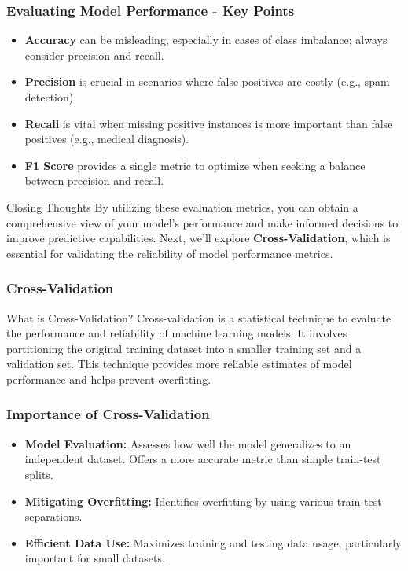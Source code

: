 \documentclass[aspectratio=169]{beamer}
\begin{document}
\begin{frame}[fragile]
    \frametitle{Evaluating Model Performance - Key Points}
    \begin{itemize}
        \item \textbf{Accuracy} can be misleading, especially in cases of class imbalance; always consider precision and recall.
        \item \textbf{Precision} is crucial in scenarios where false positives are costly (e.g., spam detection).
        \item \textbf{Recall} is vital when missing positive instances is more important than false positives (e.g., medical diagnosis).
        \item \textbf{F1 Score} provides a single metric to optimize when seeking a balance between precision and recall.
    \end{itemize}
    
    \begin{block}{Closing Thoughts}
        By utilizing these evaluation metrics, you can obtain a comprehensive view of your model's performance and make informed decisions to improve predictive capabilities. Next, we’ll explore \textbf{Cross-Validation}, which is essential for validating the reliability of model performance metrics.
    \end{block}
\end{frame}

\begin{frame}[fragile]
    \frametitle{Cross-Validation}
    \begin{block}{What is Cross-Validation?}
        Cross-validation is a statistical technique to evaluate the performance and reliability of machine learning models. It involves partitioning the original training dataset into a smaller training set and a validation set. This technique provides more reliable estimates of model performance and helps prevent overfitting.
    \end{block}
\end{frame}

\begin{frame}[fragile]
    \frametitle{Importance of Cross-Validation}
    \begin{itemize}
        \item \textbf{Model Evaluation:} Assesses how well the model generalizes to an independent dataset. Offers a more accurate metric than simple train-test splits.
        \item \textbf{Mitigating Overfitting:} Identifies overfitting by using various train-test separations.
        \item \textbf{Efficient Data Use:} Maximizes training and testing data usage, particularly important for small datasets.
    \end{itemize}
\end{frame}
\end{document}

